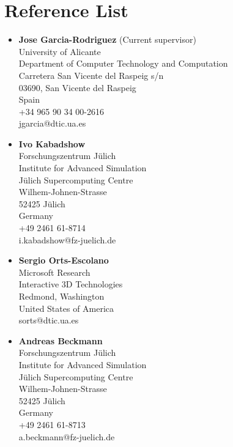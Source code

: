 \documentclass[8pt]{article}
\begin{document}
\section*{Reference List}
\begin{itemize}
	\item {\textbf{Jose Garcia-Rodriguez} (Current supervisor)\\
    University of Alicante\\
    Department of Computer Technology and Computation\\
    Carretera San Vicente del Raspeig s/n\\
    03690, San Vicente del Raspeig\\
    Spain\\
    +34 965 90 34 00-2616\\
    jgarcia@dtic.ua.es\\}
  \item {\textbf{Ivo Kabadshow}\\
    Forschungszentrum Jülich\\
    Institute for Advanced Simulation\\
    Jülich Supercomputing Centre\\
    Wilhem-Johnen-Strasse\\
    52425 Jülich\\
    Germany\\
    +49 2461 61-8714\\
    i.kabadshow@fz-juelich.de\\}
	\item {\textbf{Sergio Orts-Escolano}\\
		Microsoft Research\\
		Interactive 3D Technologies\\
		Redmond, Washington\\
		United States of America\\
		sorts@dtic.ua.es\\}
  \item {\textbf{Andreas Beckmann}\\
    Forschungszentrum Jülich\\
    Institute for Advanced Simulation\\
    Jülich Supercomputing Centre\\
    Wilhem-Johnen-Strasse\\
    52425 Jülich\\
    Germany\\
    +49 2461 61-8713\\
    a.beckmann@fz-juelich.de\\}

\end{itemize}
 
\end{document}
